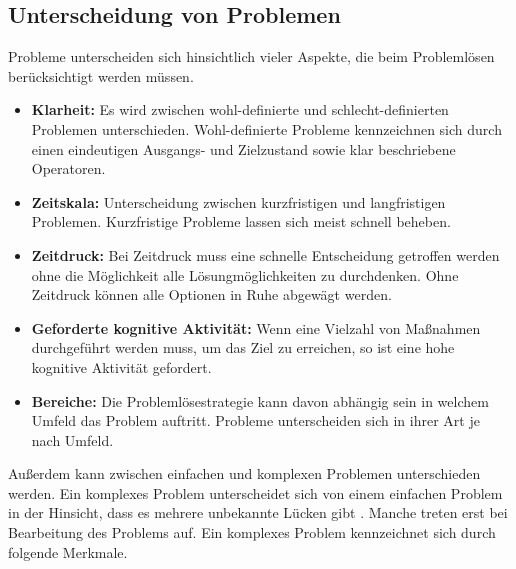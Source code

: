 \subsection{Unterscheidung von Problemen}
Probleme unterscheiden sich hinsichtlich vieler Aspekte, die beim Problemlösen berücksichtigt werden müssen. \cite{Betsch2011}
\begin{itemize}
\item \textbf{Klarheit:} Es wird zwischen wohl-definierte und schlecht-definierten Problemen unterschieden. Wohl-definierte Probleme kennzeichnen sich durch einen eindeutigen Ausgangs- und Zielzustand sowie klar beschriebene Operatoren.
\item \textbf{Zeitskala:} Unterscheidung zwischen kurzfristigen und langfristigen Problemen. Kurzfristige Probleme lassen sich meist schnell beheben.
\item \textbf{Zeitdruck:} Bei Zeitdruck muss eine schnelle Entscheidung getroffen werden ohne die Möglichkeit alle Lösungmöglichkeiten zu durchdenken. Ohne Zeitdruck können alle Optionen in Ruhe abgewägt werden.
\item \textbf{Geforderte kognitive Aktivität:} Wenn eine Vielzahl von Maßnahmen durchgeführt werden muss, um das Ziel zu erreichen, so ist eine hohe kognitive Aktivität gefordert.
\item \textbf{Bereiche:} Die Problemlösestrategie kann davon abhängig sein in welchem Umfeld das Problem auftritt. Probleme unterscheiden sich in ihrer Art je nach Umfeld.
\end{itemize}
Außerdem kann zwischen einfachen und komplexen Problemen unterschieden werden. Ein komplexes Problem unterscheidet sich von einem einfachen Problem in der Hinsicht, dass es mehrere unbekannte Lücken  gibt \cite{Betsch2011}. Manche treten erst bei Bearbeitung des Problems auf. Ein komplexes Problem kennzeichnet sich durch folgende Merkmale. \cite{Funke2015}
